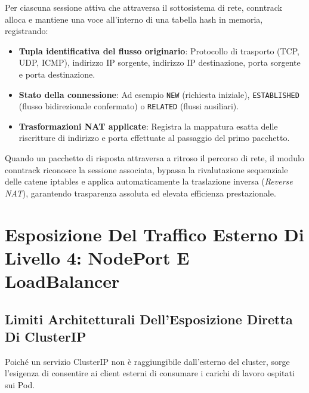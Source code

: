 \documentclass[11pt, a4paper]{article}
\begin{document}
Per ciascuna sessione attiva che attraversa il sottosistema di rete, conntrack alloca e mantiene una voce all'interno di una tabella hash in memoria, registrando:
\begin{itemize}[noitemsep]
    \item \textbf{Tupla identificativa del flusso originario}: Protocollo di trasporto (TCP, UDP, ICMP), indirizzo IP sorgente, indirizzo IP destinazione, porta sorgente e porta destinazione.
    \item \textbf{Stato della connessione}: Ad esempio \texttt{NEW} (richiesta iniziale), \texttt{ESTABLISHED} (flusso bidirezionale confermato) o \texttt{RELATED} (flussi ausiliari).
    \item \textbf{Trasformazioni NAT applicate}: Registra la mappatura esatta delle riscritture di indirizzo e porta effettuate al passaggio del primo pacchetto.
\end{itemize}

Quando un pacchetto di risposta attraversa a ritroso il percorso di rete, il modulo conntrack riconosce la sessione associata, bypassa la rivalutazione sequenziale delle catene iptables e applica automaticamente la traslazione inversa (\emph{Reverse NAT}), garantendo trasparenza assoluta ed elevata efficienza prestazionale.

\newpage


\section{Esposizione Del Traffico Esterno Di Livello 4: NodePort E LoadBalancer}

\subsection{Limiti Architetturali Dell'Esposizione Diretta Di ClusterIP}
Poiché un servizio ClusterIP non è raggiungibile dall'esterno del cluster, sorge l'esigenza di consentire ai client esterni di consumare i carichi di lavoro ospitati sui Pod.
\end{document}
